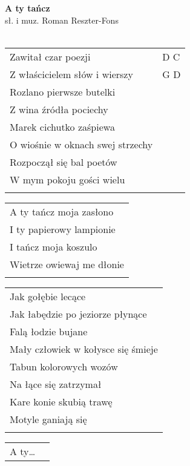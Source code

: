 \documentclass[a5paper]{article}
\begin{document}


\noindent
\fontsize{12pt}{15pt}\selectfont
\textbf{A ty tańcz} \\
\fontsize{8pt}{10pt}\selectfont
sł. i muz. Roman Reszter-Fons \\ \\
\fontsize{10pt}{12pt}\selectfont
{}
\begin{tabular}{@{}p{8.5cm}p{3cm}@{}}
\noindent
Zawitał czar poezji & D C \\
Z właścicielem słów i wierszy & G D \\
Rozlano pierwsze butelki & \\
Z wina źródła pociechy & \\
Marek cichutko zaśpiewa & \\
O wiośnie w oknach swej strzechy & \\
Rozpoczął się bal poetów & \\
W mym pokoju gości wielu & \\ \\
\end{tabular}

\noindent
\begin{tabular}{@{}p{8.5cm}@{}}
A ty tańcz moja zasłono \\
I ty papierowy lampionie \\
I tańcz moja koszulo \\
Wietrze owiewaj me dłonie \\ \\
\end{tabular}

\noindent
\begin{tabular}{@{}p{9.5cm}@{}}
Jak gołębie lecące \\
Jak łabędzie po jeziorze płynące \\
Falą łodzie bujane \\
Mały człowiek w kołysce się śmieje \\
Tabun kolorowych wozów \\
Na łące się zatrzymał \\
Kare konie skubią trawę \\
Motyle ganiają się \\ \\
\end{tabular}

\noindent
\begin{tabular}{@{}p{8.5cm}p{3cm}@{}}
A ty…
\end{tabular}
\end{document}
